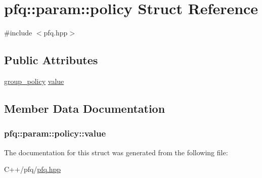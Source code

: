 \hypertarget{structpfq_1_1param_1_1policy}{\section{pfq\+:\+:param\+:\+:policy Struct Reference}
\label{structpfq_1_1param_1_1policy}
}


{\ttfamily \#include $<$pfq.\+hpp$>$}

\subsection*{Public Attributes}
\begin{DoxyCompactItemize}
\item 
\hyperlink{namespacepfq_ac41249c8510558905b01fa4d866a38d7}{group\+\_\+policy} \hyperlink{structpfq_1_1param_1_1policy_ab0e84b461546b9e889dbe7b56ae39cdf}{value}
\end{DoxyCompactItemize}


\subsection{Member Data Documentation}
\hypertarget{structpfq_1_1param_1_1policy_ab0e84b461546b9e889dbe7b56ae39cdf}{
\subsubsection[{value}]{ pfq\+::param\+::policy\+::value}}\label{structpfq_1_1param_1_1policy_ab0e84b461546b9e889dbe7b56ae39cdf}


The documentation for this struct was generated from the following file\+:\begin{DoxyCompactItemize}
\item 
C++/pfq/\hyperlink{pfq_8hpp}{pfq.\+hpp}\end{DoxyCompactItemize}
